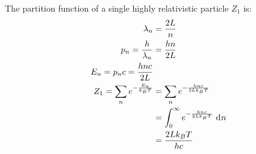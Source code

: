 \documentclass{article}
\begin{document}
\clearpage

The partition function of a single highly relativistic particle $Z_1$ is:
\begin{equation}
    \begin{split}
        \lambda_n & = \frac{2L}{n} \\
        p_n = \frac{h}{\lambda_n} & = \frac{hn}{2L} \\
        E_n = p_nc = \frac{hnc}{2L} \\
        Z_1 = \sum_n e^{-\frac{E_n}{k_BT}} & = \sum_n e^{-\frac{hnc}{2Lk_BT}} \\
        & = \int_0^{\infty} e^{-\frac{hnc}{2Lk_BT}} \, \diff{n} \\
        & = \frac{2Lk_BT}{hc}
    \end{split}
\end{equation}
\end{document}
